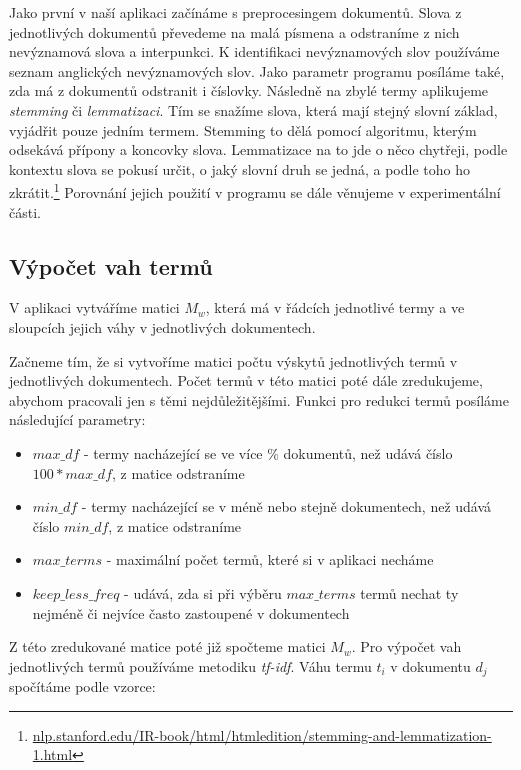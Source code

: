 \documentclass[11pt]{scrartcl} %
\begin{document}
Jako první v naší aplikaci začínáme s preprocesingem dokumentů. Slova z jednotlivých dokumentů převedeme na malá písmena a odstraníme z nich nevýznamová slova a interpunkci. K identifikaci nevýznamových slov používáme seznam anglických nevýznamových slov. Jako parametr programu posíláme také, zda má z dokumentů odstranit i číslovky. Následně na zbylé termy aplikujeme \emph{stemming} či \emph{lemmatizaci}. Tím se snažíme slova, která mají stejný slovní základ, vyjádřit pouze jedním termem. Stemming to dělá pomocí algoritmu, kterým odsekává přípony a koncovky slova. Lemmatizace na to jde o něco chytřeji, podle kontextu slova se pokusí určit, o jaký slovní druh se jedná, a podle toho ho zkrátit.\footnote{\url{nlp.stanford.edu/IR-book/html/htmledition/stemming-and-lemmatization-1.html}} Porovnání jejich použití v programu se dále věnujeme v experimentální části.

\subsection{Výpočet vah termů}\label{subsec:term_weights}
V aplikaci vytváříme matici $M_w$, která má v řádcích jednotlivé termy a ve sloupcích jejich váhy v jednotlivých dokumentech.

\bigskip 

Začneme tím, že si vytvoříme matici počtu výskytů jednotlivých termů v jednotlivých dokumentech. Počet termů v této matici poté dále zredukujeme, abychom pracovali jen s těmi nejdůležitějšími. Funkci pro redukci termů posíláme následující parametry:
\begin{itemize}
	\item $\mathit{max\_df}$ - termy nacházející se ve více \% dokumentů, než udává číslo $100 * \mathit{max\_df}$, z matice odstraníme
	\item $\mathit{min\_df}$ - termy nacházející se v méně nebo stejně dokumentech, než udává číslo $\mathit{min\_df}$, z matice odstraníme
	\item $\mathit{max\_terms}$ - maximální počet termů, které si v aplikaci necháme
	\item $\mathit{keep\_less\_freq}$ - udává, zda si při výběru $\mathit{max\_terms}$ termů nechat ty nejméně či nejvíce často zastoupené v dokumentech  
\end{itemize}

\bigskip

Z této zredukované matice poté již spočteme matici $M_w$. Pro výpočet vah jednotlivých termů používáme metodiku \emph{tf-idf}. Váhu termu $t_i$ v dokumentu $d_j$ spočítáme podle vzorce:
\end{document}
